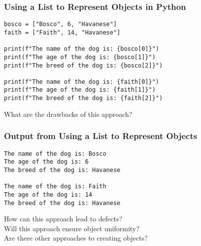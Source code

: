 \documentclass[14pt,aspectratio=169]{beamer}
\begin{document}
%
\begin{frame}[fragile]
  \frametitle{Using a List to Represent Objects in Python}
  \hspace*{-.15in}
  \begin{minipage}{6in}
    \vspace*{.1in}
    \begin{verbatim}
bosco = ["Bosco", 6, "Havanese"]
faith = ["Faith", 14, "Havanese"]

print(f"The name of the dog is: {bosco[0]}")
print(f"The age of the dog is: {bosco[1]}")
print(f"The breed of the dog is: {bosco[2]}")

print(f"The name of the dog is: {faith[0]}")
print(f"The age of the dog is: {faith[1]}")
print(f"The breed of the dog is: {faith[2]}")
    \end{verbatim}
  \end{minipage}
  \vspace*{.05in}
  \begin{center}
    \normalsize \noindent What are the drawbacks of this approach? \\
  \end{center}
\end{frame}

%
\begin{frame}[fragile]
  \frametitle{Output from Using a List to Represent Objects}
  \begin{minipage}{6in}
    \vspace*{.15in}
    \begin{verbatim}
The name of the dog is: Bosco
The age of the dog is: 6
The breed of the dog is: Havanese

The name of the dog is: Faith
The age of the dog is: 14
The breed of the dog is: Havanese
    \end{verbatim}
  \end{minipage}
  \vspace*{.05in}
  \begin{center}
    \normalsize \noindent How can this approach lead to defects? \\
    \normalsize \noindent Will this approach ensure object uniformity? \\
    \normalsize \noindent Are there other approaches to creating objects? \\
  \end{center}
\end{frame}
\end{document}
